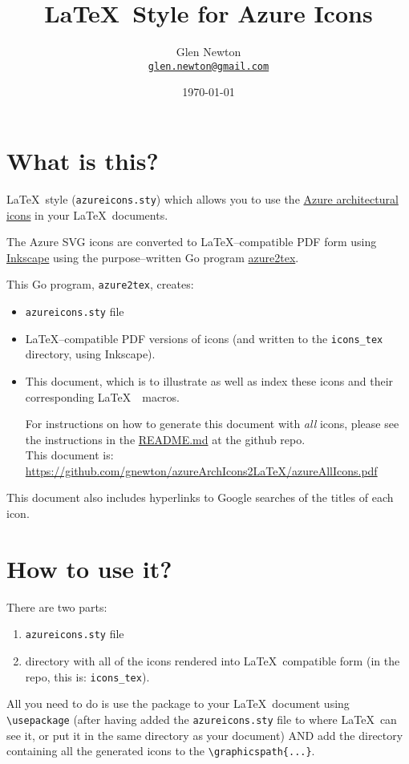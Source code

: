\documentclass[12pt]{article}
\title{\LaTeX\ Style for Azure Icons}
\author{Glen Newton \\\texttt{\href{mailto:glen.newton@gmail.com}{glen.newton@gmail.com}}}
\date{\today}
\begin{document}
\maketitle
\tableofcontents\label{toc}
\noindent\makebox[\linewidth]{\rule{\paperwidth}{0.4pt}}

\section{What is this?}
\LaTeX\ style (\texttt{azureicons.sty}) which allows you to use the \href{https://docs.microsoft.com/en-us/azure/architecture/icons/}{Azure architectural icons} in your \LaTeX\  documents.

\vspace{3mm}

\noindent The Azure SVG icons are converted to {\LaTeX}--compatible PDF form using \href{https://inkscape.org/}{Inkscape} \texttt{\inkscapeVersion} using the purpose--written Go program \href{https://github.com/gnewton/azureArchIcons2LaTeX/azure2tex}{azure2tex}. 

\noindent This Go program, \texttt{azure2tex}, creates:
\begin{itemize}
\item \texttt{azureicons.sty} file
\item \LaTeX--compatible PDF versions of icons (and written to the \texttt{icons\_tex} directory, using Inkscape).
\item This document, which is to illustrate as well as index these icons and their corresponding \LaTeX\ \  macros.

  For instructions on how to generate this document with \textit{all} icons, please see the instructions in the \href{https://github.com/gnewton/azureArchIcons2LaTeX$}{README.md} at the github repo.\\
This document is: \url{https://github.com/gnewton/azureArchIcons2LaTeX/azureAllIcons.pdf}
\end{itemize}
This document also includes hyperlinks to Google searches of the titles of each icon.


\section{How to use it?}
There are two parts:
\begin{enumerate}
\item \texttt{azureicons.sty} file
\item directory with all of the icons rendered into \LaTeX\ compatible form (in the repo, this is: \texttt{icons\_tex}).
\end{enumerate}
All you need to do is use the package to your \LaTeX\ document using \texttt{{\textbackslash}usepackage} (after having added the \texttt{azureicons.sty} file to where \LaTeX\ can see it, or put it in the same directory as your document) AND add the directory containing all the generated icons to the \texttt{{\textbackslash}graphicspath\{...\}}.\\
\end{document}
